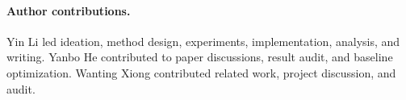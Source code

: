 \documentclass[sigconf, nonacm]{acmart}
\begin{document}
\paragraph{Author contributions.}
Yin Li led ideation, method design, experiments, implementation, analysis, and writing. Yanbo He contributed to paper discussions, result audit, and baseline optimization. Wanting Xiong contributed related work, project discussion, and audit.



\end{document}
